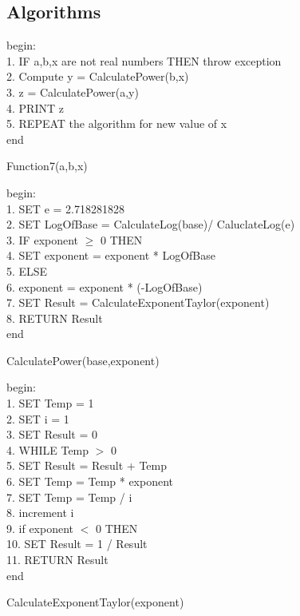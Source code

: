 \documentclass[a4paper, 11pt]{article}
\begin{document}
\newpage
\subsection{Algorithms}
\vskip 0.198in
\begin{algorithm}
begin: \\
1. IF a,b,x are not real numbers THEN throw exception\\
2. Compute y = CalculatePower(b,x)   \\
3. z = CalculatePower(a,y) \\
4. PRINT z\\
5. REPEAT the algorithm for new value of x \\
end
\caption{Function7(a,b,x)}
\end{algorithm}
\vskip 0.198in
\begin{algorithm}
begin:\\
1. SET e = 2.718281828\\
2. SET LogOfBase = CalculateLog(base)/ CaluclateLog(e) \\
3. IF exponent $\geq$ 0 THEN\\
4. \hspace{3em} SET exponent = exponent * LogOfBase \\
5. ELSE \\
6. \hspace{3em} exponent = exponent * (-LogOfBase)\\
7. SET Result = CalculateExponentTaylor(exponent) \\
8. RETURN Result\\
end
\caption{CalculatePower(base,exponent)}
\end{algorithm}

\begin{algorithm}
begin:\\
1. SET Temp = 1 \\
2. SET i = 1 \\
3. SET Result = 0 \\
4. WHILE Temp $>$ 0\\
5. \hspace{3em} SET Result = Result + Temp \\
6. \hspace{3em} SET Temp = Temp * exponent \\
7. \hspace{3em} SET Temp = Temp / i \\
8. \hspace{3em} increment i\\
9. if exponent $<$ 0 THEN\\
10. \hspace{3em} SET Result = 1 / Result\\
11. RETURN Result \\
end
\caption{CalculateExponentTaylor(exponent)}
\end{algorithm}
\end{document}
